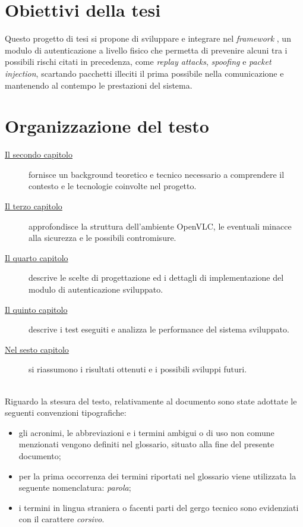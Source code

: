 \section{Obiettivi della tesi}

Questo progetto di tesi si propone di sviluppare e integrare nel \textit{framework} \cite{site:openvlc}, un modulo di autenticazione a livello fisico che permetta di prevenire alcuni tra i possibili rischi citati in precedenza, come \textit{replay attacks}, \textit{spoofing} e \textit{packet injection}, scartando pacchetti illeciti il prima possibile nella comunicazione e mantenendo al contempo le prestazioni del sistema.

\section{Organizzazione del testo}

\begin{description}
    \item[{\hyperref[cap:background]{Il secondo capitolo}}] fornisce un background teoretico e tecnico necessario a comprendere il contesto e le tecnologie coinvolte nel progetto. 
    
    \item[{\hyperref[cap:analisi]{Il terzo capitolo}}] approfondisce la struttura dell'ambiente OpenVLC, le eventuali minacce alla sicurezza e le possibili contromisure.
    
    \item[{\hyperref[cap:progettazione]{Il quarto capitolo}}] descrive le scelte di progettazione ed i dettagli di implementazione del modulo di autenticazione sviluppato.
    
    \item[{\hyperref[cap:test]{Il quinto capitolo}}] descrive i test eseguiti e analizza le performance del sistema sviluppato.
        
    \item[{\hyperref[cap:conclusioni]{Nel sesto capitolo}}] si riassumono i risultati ottenuti e i possibili sviluppi futuri.
\end{description}

\noindent \\Riguardo la stesura del testo, relativamente al documento sono state adottate le seguenti convenzioni tipografiche:
\begin{itemize}
	\item gli acronimi, le abbreviazioni e i termini ambigui o di uso non comune menzionati vengono definiti nel glossario, situato alla fine del presente documento;
	\item per la prima occorrenza dei termini riportati nel glossario viene utilizzata la seguente nomenclatura: \emph{parola}\glsfirstoccur;
	\item i termini in lingua straniera o facenti parti del gergo tecnico sono evidenziati con il carattere \emph{corsivo}.
\end{itemize}
